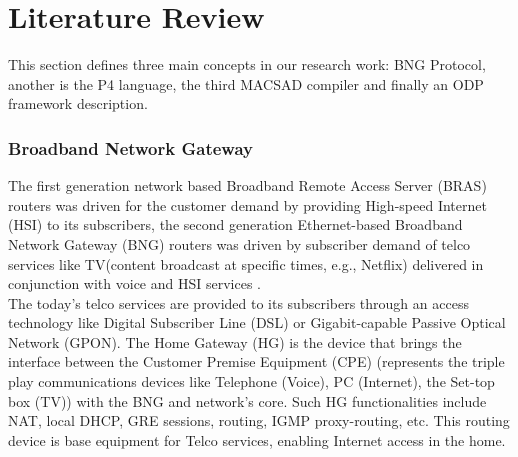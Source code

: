 \chapter{Literature Review}
\label{cap:cap02}
 This section defines three main concepts in our research work: \acrshort{BNG} Protocol, another is the \acrshort{P4} language, the third MACSAD compiler and finally an ODP framework description.

\subsection{Broadband Network Gateway}

 The first generation network based Broadband Remote Access Server (BRAS) routers was driven for the customer demand by providing High-speed Internet (HSI) to its subscribers, the second generation Ethernet-based Broadband Network Gateway (BNG) routers was driven by subscriber demand of telco services like TV(content broadcast at specific times, e.g., Netflix) delivered in conjunction with voice and HSI services \cite{Alcatel}.\\
 
 The today's telco services are provided to its subscribers through an access technology like Digital Subscriber Line (DSL) or Gigabit-capable Passive Optical Network (GPON).   The Home Gateway (HG) is the device that brings the interface between the Customer Premise Equipment (CPE)  (represents the triple play communications devices like Telephone (Voice), PC (Internet), the Set-top box (TV)) with the BNG and network's core.  Such HG functionalities include NAT, local DHCP, GRE sessions, routing, IGMP proxy-routing, etc. This routing device is base equipment for Telco services, enabling Internet access in the home.\\
 
